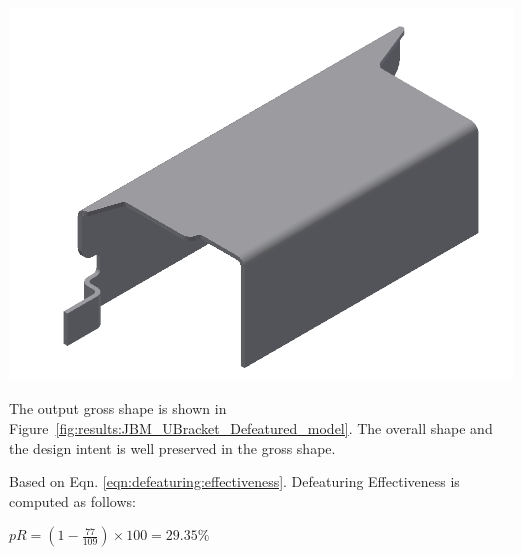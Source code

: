 \begin{minipage}{\linewidth}
\begin{minipage}[c]{0.62\linewidth}
\includegraphics[width=\linewidth,valign=t]{../Common/images/JBM_UBracket_Defeatured_model}
 \label{fig:results:JBM_UBracket_Defeatured_model}


The output gross shape is shown in Figure~\ref{fig:results:JBM_UBracket_Defeatured_model}. The overall shape and the design intent is well preserved in the gross shape.

Based on Eqn. \ref{eqn:defeaturing:effectiveness}. Defeaturing Effectiveness is computed as follows:

$pR = (1 - \frac{77}{109}) \times 100 = 29.35\%$


\end{minipage}
\end{minipage}
